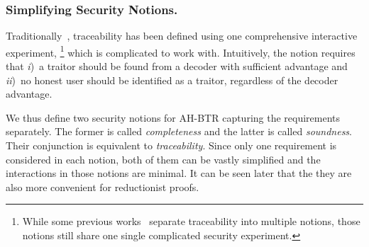\subsubsection{Simplifying Security Notions.}
Traditionally~\cite{EC:BonSahWat06}, traceability has been defined using one comprehensive interactive experiment,%
\footnote{While some previous works~\cite{C:BonFra99,STOC:GoyKopWat18,C:Zhandry20} separate traceability into multiple notions,
those notions still share one single complicated security experiment.}
which is complicated to work with.
Intuitively, the notion requires that
\emph{i})~a traitor should be found from a decoder with sufficient advantage and
\emph{ii})~no honest user should be identified as a traitor, regardless of the decoder advantage.

We thus define two security notions for AH-BTR capturing the requirements separately.
The former is called \emph{completeness} and the latter is called \emph{soundness}.
Their conjunction is equivalent to \emph{traceability}.
Since only one requirement is considered in each notion,
both of them can be vastly simplified and the interactions in those notions are minimal.
It can be seen later that the they are also more convenient for reductionist proofs.
